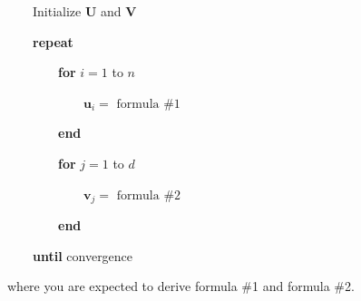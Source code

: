 \documentclass[twoside]{article}
\begin{document}
$\quad\quad$Initialize $\mathbf{U}$  and $\mathbf{V}$

\vspace{-0.75em}

$\quad\quad$\textbf{repeat}

\vspace{-0.75em}

$\quad\quad\quad\quad$\textbf{for} $i=1$ to $n$

\vspace{-0.75em}

$\quad\quad\quad\quad\quad\quad\mathbf{u}_{i}=\textrm{ formula \#1}$

\vspace{-0.75em}

$\quad\quad\quad\quad$\textbf{end}

\vspace{-0.75em}

$\quad\quad\quad\quad$\textbf{for} $j=1$ to $d$

\vspace{-0.75em}

$\quad\quad\quad\quad\quad\quad\mathbf{v}_{j}= \textrm{ formula \#2}$

\vspace{-0.75em}

$\quad\quad\quad\quad$\textbf{end}

\vspace{-0.75em}

$\quad\quad$\textbf{until} convergence

\noindent where you are expected to derive formula \#1 and formula \#2.
\end{document}
